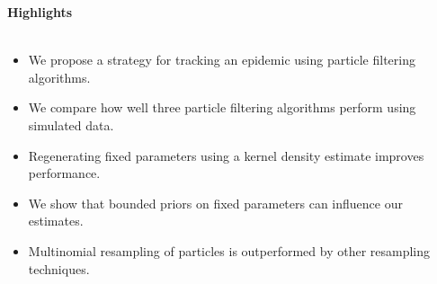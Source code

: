 \documentclass{article}
\begin{document}
{\bf Highlights} \\
\
\begin{itemize}
\item We propose a strategy for tracking an epidemic using particle filtering algorithms.
\item We compare how well three particle filtering algorithms perform using simulated data.
\item Regenerating fixed parameters using a kernel density estimate improves performance.
\item We show that bounded priors on fixed parameters can influence our estimates.
\item Multinomial resampling of particles is outperformed by other resampling techniques.
\end{itemize}
\end{document}
